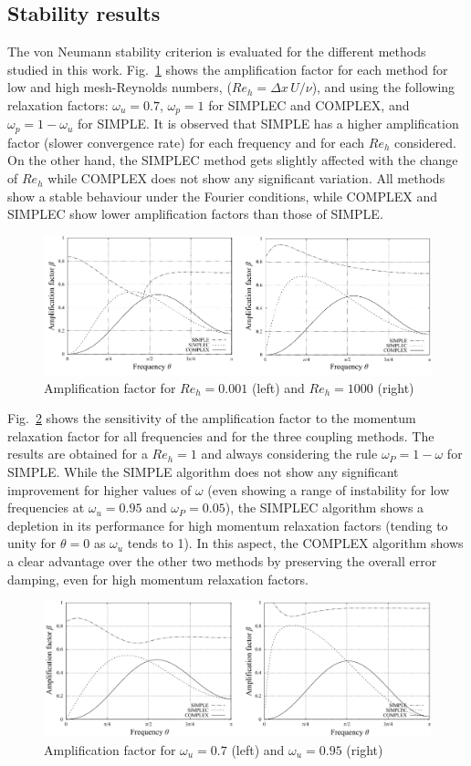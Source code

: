 \documentclass[final,3p,times,11pt,onecolumn]{myElsarticle}
\numberwithin{equation}{section}
\begin{document}
\subsection{Stability results}
The von Neumann stability criterion is evaluated for the different methods studied in this work. Fig.~\ref{fig:1a} shows the amplification factor for each method for low and high mesh-Reynolds numbers, ($Re_h = \Delta x\, U/\nu$), and using the following relaxation factors: $\omega_u=0.7$, $\omega_p = 1$ for SIMPLEC and COMPLEX, and $\omega_p=1-\omega_u$ for SIMPLE.  It is observed that SIMPLE has a higher amplification factor (slower convergence rate) for each frequency and for each $Re_h$ considered. On the other hand, the SIMPLEC method gets slightly affected with the change of $Re_h$ while COMPLEX does not show any significant variation. All methods show a stable behaviour under the Fourier conditions, while COMPLEX and SIMPLEC show lower amplification factors than those of SIMPLE.
\begin{figure}[t!!]
    \centering
    \includegraphics[width=\textwidth]{fig/Re_fourier.pdf}
    \caption{Amplification factor for $Re_h=0.001$ (left) and $Re_h=1000$ (right)}
    \label{fig:1a}
\end{figure}
Fig.~\ref{fig:1b} shows the sensitivity of the amplification factor to the momentum relaxation factor for all frequencies and for the three coupling methods. The results are obtained for a $Re_h=1$ and always considering the rule $\omega_P = 1 - \omega$ for SIMPLE. While the SIMPLE algorithm does not show any significant improvement for higher values of $\omega$ (even showing a range of instability for low frequencies at $\omega_u=0.95$ and $\omega_P=0.05$), the SIMPLEC algorithm shows a depletion in its performance for high momentum relaxation factors (tending to unity for $\theta=0$ as $\omega_u$ tends to 1). In this aspect, the COMPLEX algorithm shows a clear advantage over the other two methods by preserving the overall error damping, even for high momentum relaxation factors.     
\begin{figure}[t!!]
    \centering
    \includegraphics[width=\textwidth]{fig/w_fourier.pdf}
    \caption{Amplification factor for $\omega_u=0.7$ (left) and $\omega_u=0.95$ (right)}
    \label{fig:1b}
\end{figure}    
\end{document}
